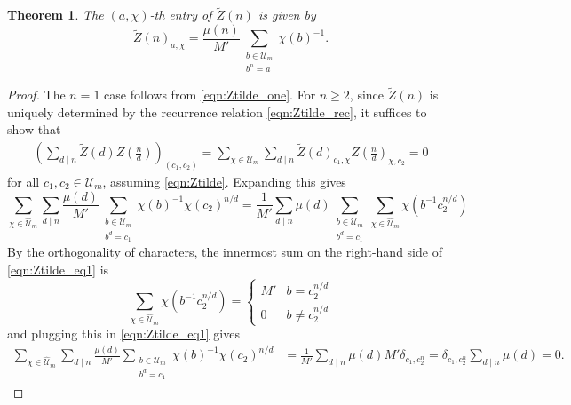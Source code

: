 \documentclass[10pt,a4paper]{amsart}
\newtheorem{theorem}{Theorem}
\newcommand{\scU}{\mathscr{U}}
\newcommand{\what}[1]{\widehat{#1}}
\begin{document}
\begin{theorem}
    \label{thm:Ztilde}
    The $(a, \chi)$-th entry of $\widetilde{Z}(n)$ is given by
    \begin{equation}
    \label{eqn:Ztilde}
        \widetilde{Z}(n)_{a, \chi} = \frac{\mu(n)}{M'} \sum_{\substack{b \in \scU_m \\ b^n = a}} \chi(b)^{-1}.
    \end{equation}
\end{theorem}

\begin{proof}
The $n = 1$ case follows from \eqref{eqn:Ztilde_one}.
For $n \ge 2$, since $\widetilde{Z}(n)$ is uniquely determined by the recurrence relation \eqref{eqn:Ztilde_rec}, it suffices to show that
\begin{align*}
    \left(\sum_{d \mid n} \widetilde{Z}(d) Z\left(\frac{n}{d}\right)\right)_{(c_1, c_2)} = \sum_{\chi \in \what{\scU}_m}\sum_{d \mid n} \widetilde{Z}(d)_{c_1, \chi} Z\left(\frac{n}{d}\right)_{\chi, c_2} = 0
\end{align*}
for all $c_1, c_2 \in \scU_m$, assuming \eqref{eqn:Ztilde}.
Expanding this gives
\begin{equation}
\label{eqn:Ztilde_eq1}
    \sum_{\chi \in \what{\scU}_m} \sum_{d \mid n} \frac{\mu(d)}{M'} \sum_{\substack{b \in \scU_m \\ b^d = c_1}} \chi(b)^{-1} \chi(c_2)^{n/d} = \frac{1}{M'} \sum_{d \mid n} \mu(d) \sum_{\substack{b \in \scU_m \\ b^d = c_1}} \sum_{\chi \in \what{\scU}_m} \chi(b^{-1} c_2^{n/d})
\end{equation}
By the orthogonality of characters, the innermost sum on the right-hand side of \eqref{eqn:Ztilde_eq1} is
\[
\sum_{\chi \in \what{\scU}_m} \chi(b^{-1} c_2^{n/d}) = \begin{cases}
    M' & b = c_2^{n/d} \\ 0 & b \ne c_2^{n/d}
\end{cases}
\]
and plugging this in \eqref{eqn:Ztilde_eq1} gives
\begin{align*}
    \sum_{\chi \in \what{\scU}_m} \sum_{d \mid n} \frac{\mu(d)}{M'} \sum_{\substack{b \in \scU_m \\ b^d = c_1}} \chi(b)^{-1} \chi(c_2)^{n/d} &= \frac{1}{M'} \sum_{d \mid n} \mu(d) M' \delta_{c_1, c_2^n}  = \delta_{c_1, c_2^n} \sum_{d \mid n} \mu(d) = 0.
\end{align*}
\end{proof}
\end{document}
